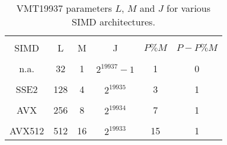 \documentclass[preprint,1p,times]{elsarticle}
\begin{document}
	\begin{table}[h!]
		\centering
		\begin{tabular}{|c | c | c | c | c | c|} 
			\hline
			\vspace{-10pt}  & \vspace{0pt} & \vspace{0pt}& \vspace{0pt}& \vspace{0pt}& \vspace{0pt} \\
			SIMD   & L   & M & J & $P \% M$ & $P-P \% M$ \\
			\hline
			\vspace{-9pt}  & \vspace{0pt} & \vspace{0pt}& \vspace{0pt}& \vspace{0pt}& \vspace{0pt} \\
			n.a.   & 32  & 1 & $2^{19937}-1$  & 1  & 0 \\		
			\hline
			\vspace{-9pt}  & \vspace{0pt} & \vspace{0pt}& \vspace{0pt}& \vspace{0pt}& \vspace{0pt} \\
			SSE2   & 128 & 4 & $2^{19935}$  & 3  & 1 \\		
			\hline
			\vspace{-9pt}  & \vspace{0pt} & \vspace{0pt}& \vspace{0pt}& \vspace{0pt}& \vspace{0pt} \\
			AVX    & 256 & 8 & $2^{19934}$  & 7  & 1 \\		
			\hline
			\vspace{-9pt}  & \vspace{0pt} & \vspace{0pt}& \vspace{0pt}& \vspace{0pt}& \vspace{0pt} \\
			AVX512 & 512 & 16 & $2^{19933}$ & 15 & 1 \\		
			\hline
		\end{tabular}
		\caption{\label{tab:jvalues} VMT19937 parameters $L$, $M$ and $J$ for various SIMD architectures.}
	\end{table}
	
\end{document}
